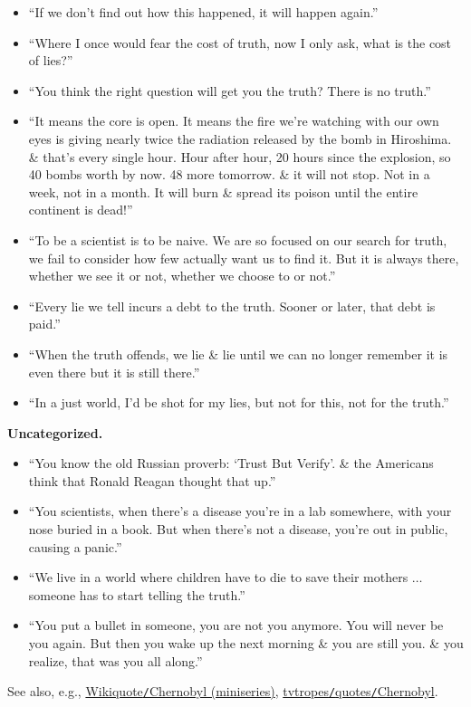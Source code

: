 \documentclass{article}
\begin{document}
\begin{enumerate}
\begin{itemize}
		\item ``If we don't find out how this happened, it will happen again.''
		\item ``Where I once would fear the cost of truth, now I only ask, what is the cost of lies?''
		\item ``You think the right question will get you the truth? There is no truth.''
		\item ``It means the core is open. It means the fire we're watching with our own eyes is giving nearly twice the radiation released by the bomb in Hiroshima. \& that's every single hour. Hour after hour, 20 hours since the explosion, so 40 bombs worth by now. 48 more tomorrow. \& it will not stop. Not in a week, not in a month. It will burn \& spread its poison until the entire continent is dead!''
		\item ``To be a scientist is to be naive. We are so focused on our search for truth, we fail to consider how few actually want us to find it. But it is always there, whether we see it or not, whether we choose to or not.''
		\item ``Every lie we tell incurs a debt to the truth. Sooner or later, that debt is paid.''
		\item ``When the truth offends, we lie \& lie until we can no longer remember it is even there but it is still there.''
		\item ``In a just world, I'd be shot for my lies, but not for this, not for the truth.''
	\end{itemize}
	{\bf Uncategorized.}
	\begin{itemize}
		\item ``You know the old Russian proverb: `Trust But Verify'. \& the Americans think that Ronald Reagan thought that up.''
		\item ``You scientists, when there's a disease you're in a lab somewhere, with your nose buried in a book. But when there's not a disease, you're out in public, causing a panic.''
		\item ``We live in a world where children have to die to save their mothers $\ldots$ someone has to start telling the truth.''
		\item ``You put a bullet in someone, you are not you anymore. You will never be you again. But then you wake up the next morning \& you are still you. \& you realize, that was you all along.''
	\end{itemize}
	See also, e.g., \href{https://en.wikiquote.org/wiki/Chernobyl_(miniseries)}{Wikiquote{\tt/}Chernobyl (miniseries)}, \href{https://tvtropes.org/pmwiki/pmwiki.php/Quotes/Chernobyl}{tvtropes{\tt/}quotes{\tt/}Chernobyl}.

\end{enumerate}
\end{document}
